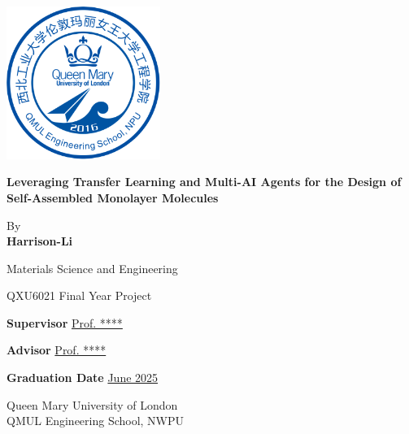 \documentclass[a4paper,12pt]{mythesisclass}
\begin{document}
	\begin{titlepage}
		\begin{center}
			\includegraphics[width=5cm]{qm_logo.png} %
			
			\vspace{1.5cm}
			
			\Large\textbf{Leveraging Transfer Learning and Multi-AI Agents for the Design of Self-Assembled Monolayer Molecules} %
			
			\vspace{1cm}
			
			\Large
			By \\
			\textbf{Harrison-Li} %
			
			\vspace{1cm}
			
			Materials Science and Engineering \\
			
			\vspace{0.5cm}
			
			QXU6021 Final Year Project
			
			\vspace{1cm}
			
			\textbf{Supervisor} 
			\underline{Prof. ****} %
			
			\vspace{0.5cm}
			\textbf{Advisor}
			\underline{Prof. ****} %
			
			\textbf{Graduation Date}
			\underline{June 2025}
			
			\vfill
			
			{\large Queen Mary University of London \\ QMUL Engineering School, NWPU}
			
		\end{center}
	\end{titlepage}
	\newpage
\end{document}
